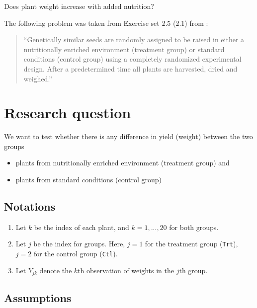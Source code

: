 \documentclass[
]{book}
\providecommand{\tightlist}{%
  \setlength{\itemsep}{0pt}\setlength{\parskip}{0pt}}
\begin{document}
Does plant weight increase with added nutrition?

The following problem was taken from Exercise set 2.5 (2.1) from \citet{dobson2008gml}:

\begin{quote}
``Genetically similar seeds are randomly assigned to be raised in either a nutritionally enriched environment (treatment group) or standard conditions (control group) using a completely randomized experimental design. After a predetermined time all plants are harvested, dried and weighed.''
\end{quote}

\hypertarget{research-question}{%
\section{Research question}\label{research-question}}

We want to test whether there is any difference in yield (weight) between the two groups

\begin{itemize}
\tightlist
\item
  plants from nutritionally enriched environment (treatment group) and
\item
  plants from standard conditions (control group)
\end{itemize}

\hypertarget{notations}{%
\subsection{Notations}\label{notations}}

\begin{enumerate}
\def\labelenumi{\arabic{enumi}.}
\tightlist
\item
  Let \(k\) be the index of each plant, and \(k = 1,...,20\) for both groups.
\item
  Let \(j\) be the index for groups. Here, \(j = 1\) for the treatment group (\texttt{Trt}), \(j = 2\) for the control group (\texttt{Ctl}).
\item
  Let \(Y_{jk}\) denote the \(k\)th observation of weights in the \(j\)th group.
\end{enumerate}

\hypertarget{assumptions}{%
\subsection{Assumptions}\label{assumptions}}
\end{document}
